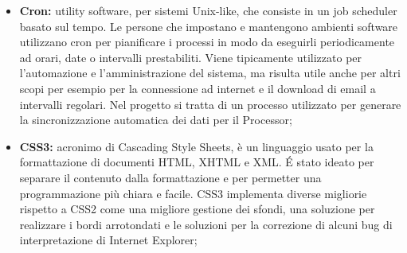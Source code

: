 \begin{itemize}
		\item \textbf{Cron:} utility software, per sistemi Unix-like, che consiste in un job scheduler basato sul tempo. Le persone che impostano e mantengono ambienti software utilizzano cron per pianificare i processi in modo da eseguirli periodicamente ad orari, date o intervalli prestabiliti. Viene tipicamente utilizzato per l'automazione e l'amministrazione del sistema, ma risulta utile anche per altri scopi per esempio per la connessione ad internet e il download di email a intervalli regolari. Nel progetto si tratta di un processo utilizzato per generare la sincronizzazione automatica dei dati per il Processor;
		\item \textbf{CSS3:} acronimo di Cascading Style Sheets, è un linguaggio usato per la formattazione di documenti HTML, XHTML e XML. É stato ideato per separare il contenuto dalla formattazione e per permetter una programmazione più chiara e facile. CSS3 implementa diverse migliorie rispetto a CSS2 come una migliore gestione dei sfondi, una soluzione per realizzare i bordi arrotondati e le soluzioni per la correzione di alcuni bug di interpretazione di Internet Explorer;
	\end{itemize}
\pagebreak

